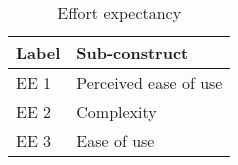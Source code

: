 \begin{table}[H]
\centering
\begin{tabular}{p{1cm} p{14cm}}

\toprule
Label & Sub-construct \\
\midrule
EE 1    &	Perceived ease of use \\
EE 2    &	Complexity \\
EE 3    &	Ease of use \\

\bottomrule

\end{tabular}
\caption{Effort expectancy}
\end{table}